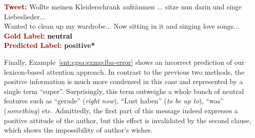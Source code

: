 \begin{example}\label{snt:cgsa:exmp:baziotis-error}
  \noindent\textup{\bfseries\textcolor{darkred}{Tweet:}} {\upshape \colorbox{white!1.4}{Wollte} \colorbox{blue!7.7}{meinen} \colorbox{white!3.6}{Kleiderschrank} \colorbox{blue!1.7}{aufr\"aumen} ... \colorbox{white!1.2}{sitze} \colorbox{green!4.6}{nun} \colorbox{green!31.5}{darin} \colorbox{green!2.8}{und} \colorbox{green!29.7}{singe} \colorbox{green!15.2}{Liebeslieder}...}\\
  \noindent \colorbox{white!1.4}{Wanted} to \colorbox{blue!1.7}{clean up} \colorbox{blue!7.7}{my} \colorbox{white!3.6}{wardrobe}... \colorbox{green!4.6}{Now} \colorbox{white!1.2}{sitting} \colorbox{green!31.5}{in it} \colorbox{green!2.8}{and} \colorbox{green!29.7}{singing} \colorbox{green!15.2}{love songs}...\\[\exampleSep]
  \noindent\textup{\bfseries\textcolor{darkred}{Gold Label:}}\hspace*{4.3em}\textbf{%
    \upshape\textcolor{black}{neutral}}\\
 \noindent\textup{\bfseries\textcolor{darkred}{Predicted Label:}}\hspace*{2em}\textbf{%
    \upshape\textcolor{green3}{positive*}}
\end{example}

Finally, Example~\ref{snt:cgsa:exmp:lba-error} shows an incorrect
prediction of our lexicon-based attention approach.  In contrast to
the previous two methods, the positive information is much more
condensed in this case and represented by a single term ``super''.
Surprisingly, this term outweighs a whole bunch of neutral features
such as ``gerade'' (\emph{right now}), ``Lust haben'' (\emph{to be up
  to}), ``was'' (\emph{something}) etc.  Admittedly, the first part of
this message indeed expresses a positive attitude of the author, but
this effect is invalidated by the second clause, which shows the
impossibility of author's wishes.

